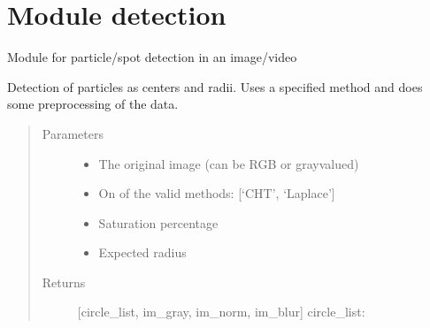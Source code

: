 \documentclass[letterpaper,10pt,english]{sphinxmanual}
\begin{document}
\chapter{Module detection}
\label{\detokenize{index:module-detection}}
Module for particle/spot detection in an image/video

\label{\detokenize{index:module-2}}

\begin{fulllineitems}
\label{\detokenize{index:mlpy.detection.detection}}
Detection of particles as centers and radii. Uses a specified method and does some pre\sphinxhyphen{}processing of the data.
\begin{quote}\begin{description}
\item[{Parameters}] \leavevmode\begin{itemize}
\item {} 
 \textendash{} The original image (can be RGB or gray\sphinxhyphen{}valued)

\item {} 
 \textendash{} On of the valid methods: {[}‘CHT’, ‘Laplace’{]}

\item {} 
 \textendash{} Saturation percentage

\item {} 
 \textendash{} Expected radius

\end{itemize}

\item[{Returns}] \leavevmode
{[}circle\_list, im\_gray, im\_norm, im\_blur{]}
circle\_list:

\end{description}\end{quote}

\end{fulllineitems}
\end{document}
